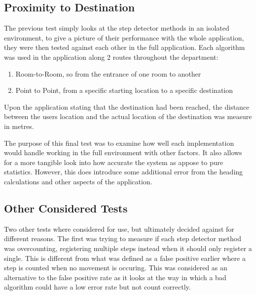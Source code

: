 \documentclass[main.tex]{subfiles}
\begin{document}
\subsection{Proximity to Destination}

The previous test simply looks at the step detector methods in an isolated environment, to give a picture of their performance with the whole application, they were then tested against each other in the full application. Each algorithm was used in the application along 2 routes throughout the department:

\begin{enumerate}
	\item Room-to-Room, so from the entrance of one room to another  %
	\item Point to Point, from a specific starting location to a specific destination  %
\end{enumerate}

Upon the application stating that the destination had been reached, the distance between the users location and the actual location of the destination was measure in metres.

The purpose of this final test was to examine how well each implementation would handle working in the full environment with other factors. It also allows for a more tangible look into how accurate the system as appose to pure statistics. However, this does introduce some additional error from the heading calculations and other aspects of the application.


\subsection{Other Considered Tests}

Two other tests where considered for use, but ultimately decided against for different reasons. The first was trying to measure if each step detector method was overcounting, registering multiple steps instead when it should only register a single. This is different from what was defined as a false positive earlier where a step is counted when no movement is occuring. This was considered as an alternative to the false positive rate as it looks at the way in which a bad algorithm could have a low error rate but not count correctly. 
\end{document}
